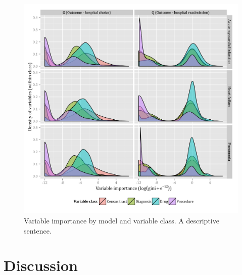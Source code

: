 \documentclass[]{article}
\begin{document}
\begin{figure}[H]
    \includegraphics{../figures/variable_importance_by_model_and_class.png}
    \caption[Error rate for random forest model of hospital choice.]
      {Variable importance by model and variable class. A descriptive sentence.}
    \label{fig:variable_importance_by_model_and_class}
\end{figure}


\section{Discussion}

\printbibliography
\end{document}
